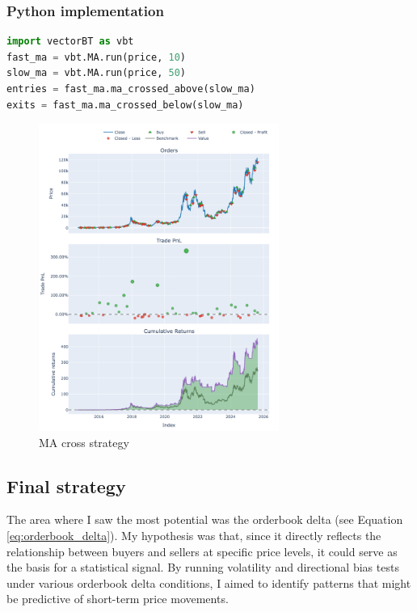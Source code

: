 \documentclass[12pt]{article}
\begin{document}
\subsubsection*{Python implementation}
\begin{lstlisting}[language=Python]
import vectorBT as vbt
fast_ma = vbt.MA.run(price, 10)
slow_ma = vbt.MA.run(price, 50)
entries = fast_ma.ma_crossed_above(slow_ma)
exits = fast_ma.ma_crossed_below(slow_ma)
\end{lstlisting}

\begin{figure}[h]
    \centering
    \includegraphics[width=0.7\textwidth]{imgs/strat_show_case_btc.png}
    \caption{MA cross strategy}
    \label{fig:ma_cross_strategy}
\end{figure}

\newpage

\subsection{Final strategy}
The area where I saw the most potential was the orderbook delta (see Equation \ref{eq:orderbook_delta}). My hypothesis was that, since it directly reflects the relationship between buyers and sellers at specific price levels, it could serve as the basis for a statistical signal. By running volatility and directional bias tests under various orderbook delta conditions, I aimed to identify patterns that might be predictive of short-term price movements.
\end{document}
